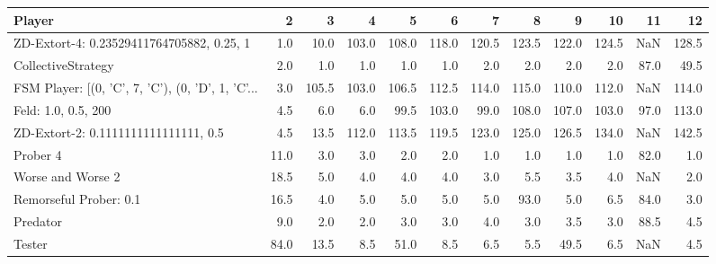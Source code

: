 \begin{tabular}{lrrrrrrrrrrr}
\toprule
                                            Player &     2 &      3 &      4 &      5 &      6 &      7 &      8 &      9 &     10 &    11 &     12 \\
\midrule
         ZD-Extort-4: 0.23529411764705882, 0.25, 1 &   1.0 &   10.0 &  103.0 &  108.0 &  118.0 &  120.5 &  123.5 &  122.0 &  124.5 &   NaN &  128.5 \\
                                CollectiveStrategy &   2.0 &    1.0 &    1.0 &    1.0 &    1.0 &    2.0 &    2.0 &    2.0 &    2.0 &  87.0 &   49.5 \\
 FSM Player: [(0, 'C', 7, 'C'), (0, 'D', 1, 'C'... &   3.0 &  105.5 &  103.0 &  106.5 &  112.5 &  114.0 &  115.0 &  110.0 &  112.0 &   NaN &  114.0 \\
                               Feld: 1.0, 0.5, 200 &   4.5 &    6.0 &    6.0 &   99.5 &  103.0 &   99.0 &  108.0 &  107.0 &  103.0 &  97.0 &  113.0 \\
              ZD-Extort-2: 0.1111111111111111, 0.5 &   4.5 &   13.5 &  112.0 &  113.5 &  119.5 &  123.0 &  125.0 &  126.5 &  134.0 &   NaN &  142.5 \\
                                          Prober 4 &  11.0 &    3.0 &    3.0 &    2.0 &    2.0 &    1.0 &    1.0 &    1.0 &    1.0 &  82.0 &    1.0 \\
                                 Worse and Worse 2 &  18.5 &    5.0 &    4.0 &    4.0 &    4.0 &    3.0 &    5.5 &    3.5 &    4.0 &   NaN &    2.0 \\
                            Remorseful Prober: 0.1 &  16.5 &    4.0 &    5.0 &    5.0 &    5.0 &    5.0 &   93.0 &    5.0 &    6.5 &  84.0 &    3.0 \\
                                          Predator &   9.0 &    2.0 &    2.0 &    3.0 &    3.0 &    4.0 &    3.0 &    3.5 &    3.0 &  88.5 &    4.5 \\
                                            Tester &  84.0 &   13.5 &    8.5 &   51.0 &    8.5 &    6.5 &    5.5 &   49.5 &    6.5 &   NaN &    4.5 \\
\bottomrule
\end{tabular}
